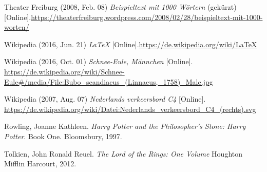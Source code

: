 \documentclass{scrreprt}
\begin{document}
	\begin{thebibliography}{mmmmmmm}
	\label{bib:thebib}
		 Theater Freiburg (2008, Feb. 08) \textit{Beispieltext mit 1000 Wörtern} (gekürzt)[Online].\newline \url{https://theaterfreiburg.wordpress.com/2008/02/28/beispieltext-mit-1000-worten/} 
		
		 Wikipedia (2016, Jun. 21) \textit{LaTeX} [Online].\newline \url{https://de.wikipedia.org/wiki/LaTeX} 
		
		 Wikipedia (2016, Oct. 01) \textit{Schnee-Eule, Männchen} [Online]. \newline
		\url{https://de.wikipedia.org/wiki/Schnee-Eule#/media/File:Bubo_scandiacus_(Linnaeus,_1758)_Male.jpg}
		
		 Wikipedia (2007, Aug. 07) \textit{Nederlands verkeersbord C4} [Online]. \newline
		\url{https://de.wikipedia.org/wiki/Datei:Nederlands_verkeersbord_C4_(rechts).svg}
		
		 Rowling, Joanne Kathleen. \textit{Harry Potter and the Philosopher's Stone: Harry Potter}. Book One. Bloomsbury, 1997.
		
		 Tolkien, John Ronald Reuel. \textit{The Lord of the Rings: One Volume} Houghton Mifflin Harcourt, 2012.
		
		
	
	
	\end{thebibliography}
\end{document}
